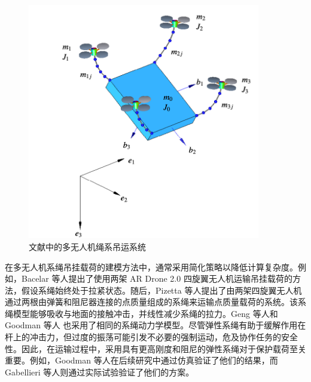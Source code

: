 \documentclass[lang=chs, degree=master, blindreview=false, winfonts=true]{yanputhesis}
\begin{document}
\begin{figure}[hbt!]
	\centering
	\includegraphics[width=24pc]{picture/1_6.png} 
	\caption{文献中的多无人机绳系吊运系统} \label{1_6}
\end{figure}
在多无人机系绳吊挂载荷的建模方法中，通常采用简化策略以降低计算复杂度。例如，Bacelar 等人\cite{bacelar2020board}提出了使用两架 AR Drone 2.0 四旋翼无人机运输吊挂载荷的方法，假设系绳始终处于拉紧状态。随后，Pizetta 等人提出了由两架四旋翼无人机通过两根由弹簧和阻尼器连接的点质量组成的系绳来运输点质量载荷的系统。该系绳模型能够吸收与地面的接触冲击，并线性减少系绳的拉力。Geng 等人\cite{geng2020cooperative}和 Goodman 等人\cite{goodman2023geometric} 也采用了相同的系绳动力学模型。尽管弹性系绳有助于缓解作用在杆上的冲击力，但过度的振荡可能引发不必要的强制运动，危及协作任务的安全性。因此，在运输过程中，采用具有更高刚度和阻尼的弹性系绳对于保护载荷至关重要。例如，Goodman 等人\cite{goodman2022geometric}在后续研究中通过仿真验证了他们的结果，而 Gabellieri 等人\cite{gabellieri2023equilibria}则通过实际试验验证了他们的方案。
\end{document}

